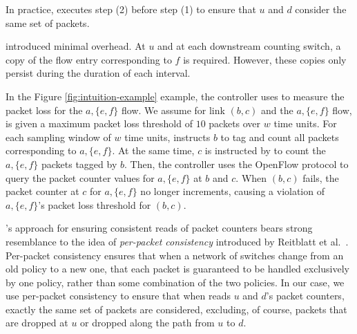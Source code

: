 In practice, \pcnt executes step (2) before step (1) to ensure that $u$ and $d$ consider the same set of packets.


\pcnt introduced minimal overhead.  At $u$ and at each downstream counting switch, a copy of the flow entry corresponding to $f$ is required.  
However, these copies only persist during the duration of each \pcnt interval.


In the Figure \ref{fig:intuition-example} example, the controller uses \fl to measure the packet loss for the $a,\{e,f\}$ flow.  
We assume for link $(b,c)$ and the $a,\{e,f\}$ flow, \fl is given a maximum packet loss threshold of $10$ packets over $w$ time units.
For each sampling window of $w$ time units, \pcnt instructs $b$ to tag and count all packets corresponding to $a,\{e,f\}$. 
At the same time, $c$ is instructed by \pcnt to count the $a,\{e,f\}$ packets tagged by $b$. Then, the controller uses the OpenFlow protocol to query the packet counter values for $a,\{e,f\}$
at $b$ and $c$.  When $(b,c)$ fails, the packet counter at $c$ for $a,\{e,f\}$ no longer increments, causing a violation of $a,\{e,f\}$'s packet loss threshold for $(b,c)$.




\pcnts's approach for ensuring consistent reads of packet counters bears strong resemblance to the idea of \emph{per-packet consistency} introduced by Reitblatt et al.~\cite{Reitblatt11}.
Per-packet consistency ensures that when a network of switches change from an old policy to a new one, that
each packet is guaranteed to be handled exclusively by one policy, rather than some combination of the two policies.  In our case, we use per-packet consistency to ensure that when \pcnt reads
$u$ and $d$'s packet counters, exactly the same set of packets are considered, excluding, of course, packets that are dropped at $u$ or dropped along the path from $u$ to $d$. 

